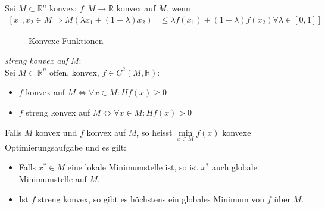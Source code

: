 Sei $M\subset\mathbb{R}^n$ konvex: $f:M\rightarrow\mathbb{R}$ konvex auf $M$, wenn 
\begin{align*}
	\left[ x_1,x_2\in M \Rightarrow M(\lambda x_1+(1-\lambda)x_2)\right. & \left.\le \lambda f(x_1)+(1-\lambda)f(x_2)\forall\lambda\in[0,1]\right]
\end{align*}
\begin{figure}[!htb]
	\centering
	\subfloat[$f$ konvex]{}\qquad
	\caption{Konvexe Funktionen}
	\label{fig:kap_1_konvex_fkt}
\end{figure}

\textit{streng konvex auf} $M$:\\
Sei $M\subset\mathbb{R}^n$ offen, konvex, $f\in C^2(M,\mathbb{R})$:
\begin{itemize}
  \item $f$ konvex auf $M\Leftrightarrow\forall x\in M:H f(x)\ge 0$
  \item $f$ streng konvex auf $M\Leftrightarrow\forall x\in M: H f(x)>0$
\end{itemize}
Falls $M$ konvex und $f$ konvex auf $M$, so heisst $\min\limits_{x\in M}f(x)$ konvexe Optimierungsaufgabe und es gilt:
\begin{itemize}
  \item Falls $x^{\ast}\in M$ eine lokale Minimumstelle ist, so ist $x^{\ast}$ auch globale Minimumstelle auf $M$.
  \item Ist $f$ streng konvex, so gibt es höchstens ein globales Minimum von $f$ über $M$.
\end{itemize}
